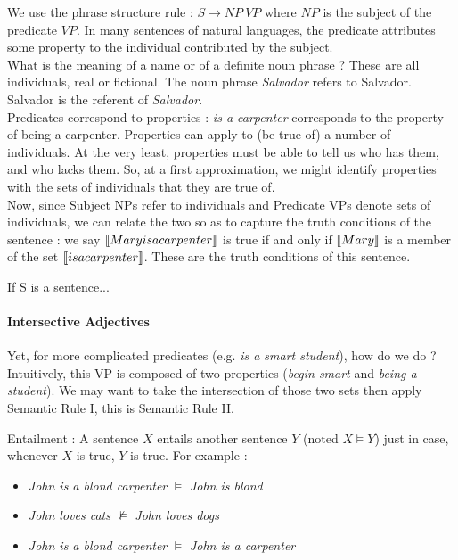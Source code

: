 \documentclass{cours}
\begin{document}
We use the phrase structure rule\! : $S \rightarrow NP \ VP$ where $NP$ is the subject of the predicate $VP$. In many sentences of natural languages, the predicate attributes some property to the individual contributed by the subject.\\
What is the meaning of a name or of a definite noun phrase ? These are all individuals, real or fictional. The noun phrase \textsl{Salvador} refers to Salvador. Salvador is the referent of \textsl{Salvador}.\\
Predicates correspond to properties\! : \textsl{is a carpenter} corresponds to the property of being a carpenter. Properties can apply to (be true of) a number of individuals. At the very least, properties must be able to tell us who has them, and who lacks them. So, at a first approximation, we might identify properties with the sets of individuals that they are true of.\\


Now, since Subject NPs refer to individuals and Predicate VPs denote sets of individuals, we can relate the two so as to capture the truth conditions of the sentence\! : we say $\left\llbracket Mary is a carpenter \right\rrbracket$ is true if and only if $\left\llbracket Mary \right\rrbracket$ is a member of the set $\left\llbracket is a carpenter \right\rrbracket$. These are the truth conditions of this sentence.
\begin{proposition}
    If S is a sentence...     
\end{proposition}

\paragraph{Intersective Adjectives}
Yet, for more complicated predicates (e.g. \textsl{is a smart student}), how do we do ? Intuitively, this VP is composed of two properties (\textsl{begin smart} and \textsl{being a student}). We may want to take the intersection of those two sets then apply Semantic Rule I, this is Semantic Rule II. 
\begin{definition}
    Entailment\! : A sentence $X$ entails another sentence $Y$ (noted $X \models Y$) just in case, whenever $X$ is true, $Y$ is true. For example\! : 
    \begin{itemize}
        \item \textsl{John is a blond carpenter} $\vDash$ \textsl{John is blond}
        \item \textsl{John loves cats} $\nvDash$ \textsl{John loves dogs}
        \item \textsl{John is a blond carpenter} $\vDash$ \textsl{John is a carpenter}
    \end{itemize}
\end{definition}
\end{document}
